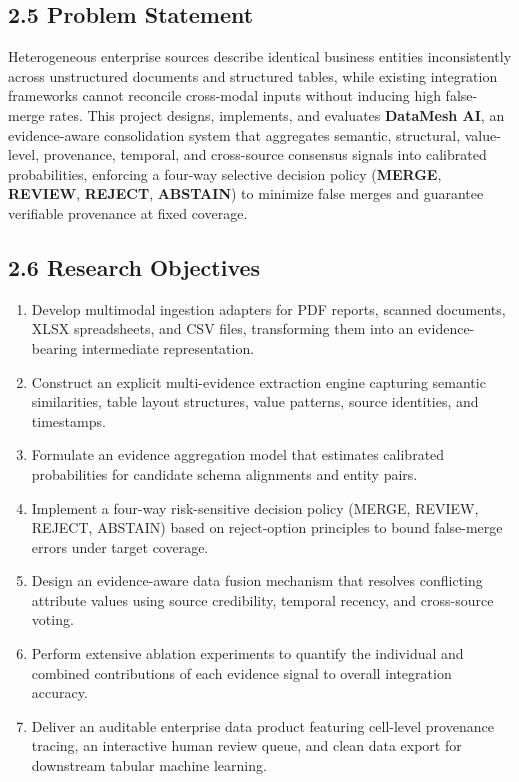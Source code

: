 \documentclass[12pt,a4paper]{article}
\begin{document}
\subsection*{2.5 Problem Statement}

Heterogeneous enterprise sources describe identical business entities inconsistently across unstructured documents and structured tables, while existing integration frameworks cannot reconcile cross-modal inputs without inducing high false-merge rates. This project designs, implements, and evaluates \textbf{DataMesh AI}, an evidence-aware consolidation system that aggregates semantic, structural, value-level, provenance, temporal, and cross-source consensus signals into calibrated probabilities, enforcing a four-way selective decision policy (\textbf{MERGE}, \textbf{REVIEW}, \textbf{REJECT}, \textbf{ABSTAIN}) to minimize false merges and guarantee verifiable provenance at fixed coverage.

\subsection*{2.6 Research Objectives}

\begin{enumerate}
  \item Develop multimodal ingestion adapters for PDF reports, scanned documents, XLSX spreadsheets, and CSV files, transforming them into an evidence-bearing intermediate representation.
  \item Construct an explicit multi-evidence extraction engine capturing semantic similarities, table layout structures, value patterns, source identities, and timestamps.
  \item Formulate an evidence aggregation model that estimates calibrated probabilities for candidate schema alignments and entity pairs.
  \item Implement a four-way risk-sensitive decision policy (MERGE, REVIEW, REJECT, ABSTAIN) based on reject-option principles to bound false-merge errors under target coverage.
  \item Design an evidence-aware data fusion mechanism that resolves conflicting attribute values using source credibility, temporal recency, and cross-source voting.
  \item Perform extensive ablation experiments to quantify the individual and combined contributions of each evidence signal to overall integration accuracy.
  \item Deliver an auditable enterprise data product featuring cell-level provenance tracing, an interactive human review queue, and clean data export for downstream tabular machine learning.
\end{enumerate}
\end{document}

